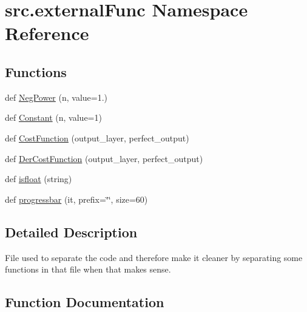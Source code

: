 \hypertarget{namespacesrc_1_1externalFunc}{}\section{src.\+external\+Func Namespace Reference}
\label{namespacesrc_1_1externalFunc}
\subsection*{Functions}
\begin{DoxyCompactItemize}
\item 
def \hyperlink{namespacesrc_1_1externalFunc_ad109e658b6213de888cda3ab041d8f5e}{Neg\+Power} (n, value=1.)
\item 
def \hyperlink{namespacesrc_1_1externalFunc_a43586749a015f0f4b1caedb8247205f6}{Constant} (n, value=1)
\item 
def \hyperlink{namespacesrc_1_1externalFunc_ad35d430146a5fc9c64b133eae37ec3fc}{Cost\+Function} (output\+\_\+layer, perfect\+\_\+output)
\item 
def \hyperlink{namespacesrc_1_1externalFunc_abb01a6305850dfeecf63a795efaa332b}{Der\+Cost\+Function} (output\+\_\+layer, perfect\+\_\+output)
\item 
def \hyperlink{namespacesrc_1_1externalFunc_aad7d46f08dec5e6eccfd0816d61d2aa6}{isfloat} (string)
\item 
def \hyperlink{namespacesrc_1_1externalFunc_a4d8a98ff52e782513517475ca6edc833}{progressbar} (it, prefix=\char`\"{}\char`\"{}, size=60)
\end{DoxyCompactItemize}


\subsection{Detailed Description}
\begin{DoxyVerb}    File used to separate the code and therefore make it cleaner by
    separating some functions in that file when that makes sense.
\end{DoxyVerb}
 

\subsection{Function Documentation}
